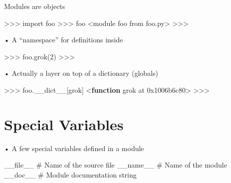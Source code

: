 \documentclass[
  letterpaper,
  DIV=11,
  numbers=noendperiod]{scrreprt}
\newenvironment{Shaded}{\begin{snugshade}}{\end{snugshade}}
\newcommand{\CommentTok}[1]{\textcolor[rgb]{0.37,0.37,0.37}{#1}}
\newcommand{\DataTypeTok}[1]{\textcolor[rgb]{0.68,0.00,0.00}{#1}}
\newcommand{\ErrorTok}[1]{\textcolor[rgb]{0.68,0.00,0.00}{#1}}
\newcommand{\KeywordTok}[1]{\textcolor[rgb]{0.00,0.23,0.31}{\textbf{#1}}}
\newcommand{\NormalTok}[1]{\textcolor[rgb]{0.00,0.23,0.31}{#1}}
\newcommand{\OtherTok}[1]{\textcolor[rgb]{0.00,0.23,0.31}{#1}}
\newcommand{\VariableTok}[1]{\textcolor[rgb]{0.07,0.07,0.07}{#1}}
\begin{document}
Modules are objects

\begin{Shaded}
\begin{Highlighting}[]
\NormalTok{\textgreater{}\textgreater{}\textgreater{} import foo}
\NormalTok{\textgreater{}\textgreater{}\textgreater{} foo}
\NormalTok{\textless{}module \textquotesingle{}foo\textquotesingle{} from \textquotesingle{}foo.py\textgreater{}}
\NormalTok{\textgreater{}\textgreater{}\textgreater{} }
\end{Highlighting}
\end{Shaded}

• A ``namespace'' for definitions inside

\begin{Shaded}
\begin{Highlighting}[]
\NormalTok{\textgreater{}\textgreater{}\textgreater{} foo.grok(2)  }
\NormalTok{\textgreater{}\textgreater{}\textgreater{} }
\end{Highlighting}
\end{Shaded}

• Actually a layer on top of a dictionary (globals)

\begin{Shaded}
\begin{Highlighting}[]
\NormalTok{\textgreater{}\textgreater{}\textgreater{} foo.\_\_dict\_\_[\textquotesingle{}grok\textquotesingle{}]}
\DataTypeTok{\textless{}}\KeywordTok{function}\OtherTok{ grok at }\ErrorTok{0x1006b6c80}\DataTypeTok{\textgreater{}}
\NormalTok{\textgreater{}\textgreater{}\textgreater{} }
\end{Highlighting}
\end{Shaded}


\chapter{Special Variables}\label{special-variables}

• A few special variables defined in a module

\begin{Shaded}
\begin{Highlighting}[]
\VariableTok{\_\_file\_\_} \CommentTok{\# Name of the source file  }
\VariableTok{\_\_name\_\_} \CommentTok{\# Name of the module  }
\NormalTok{\_\_doc\_\_ }\CommentTok{\# Module documentation string }
\end{Highlighting}
\end{Shaded}
\end{document}
